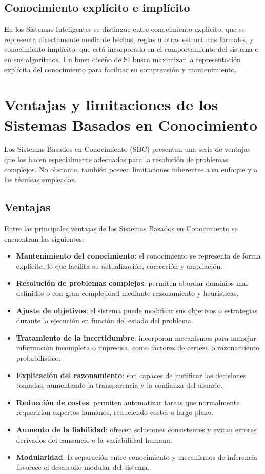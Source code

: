 \documentclass{article}
\begin{document}
    \subsection{Conocimiento explícito e implícito}
        
    En los Sistemas Inteligentes se distingue entre conocimiento explícito, que se representa directamente mediante hechos, reglas u otras estructuras formales, y conocimiento implícito, que está incorporado en el comportamiento del sistema o en sus algoritmos. Un buen diseño de SI busca maximizar la representación explícita del conocimiento para facilitar su comprensión y mantenimiento.

\section{Ventajas y limitaciones de los Sistemas Basados en Conocimiento}

    Los Sistemas Basados en Conocimiento (SBC) presentan una serie de ventajas que los hacen especialmente adecuados para la resolución de problemas complejos. No obstante, también poseen limitaciones inherentes a su enfoque y a las técnicas empleadas.

    \subsection{Ventajas}

    Entre las principales ventajas de los Sistemas Basados en Conocimiento se encuentran las siguientes:

    \begin{itemize}
        \item \textbf{Mantenimiento del conocimiento}: el conocimiento se representa de forma explícita, lo que facilita su actualización, corrección y ampliación.
        \item \textbf{Resolución de problemas complejos}: permiten abordar dominios mal definidos o con gran complejidad mediante razonamiento y heurísticas.
        \item \textbf{Ajuste de objetivos}: el sistema puede modificar sus objetivos o estrategias durante la ejecución en función del estado del problema.
        \item \textbf{Tratamiento de la incertidumbre}: incorporan mecanismos para manejar información incompleta o imprecisa, como factores de certeza o razonamiento probabilístico.
        \item \textbf{Explicación del razonamiento}: son capaces de justificar las decisiones tomadas, aumentando la transparencia y la confianza del usuario.
        \item \textbf{Reducción de costes}: permiten automatizar tareas que normalmente requerirían expertos humanos, reduciendo costes a largo plazo.
        \item \textbf{Aumento de la fiabilidad}: ofrecen soluciones consistentes y evitan errores derivados del cansancio o la variabilidad humana.
        \item \textbf{Modularidad}: la separación entre conocimiento y mecanismos de inferencia favorece el desarrollo modular del sistema.
    \end{itemize}
    
\end{document}
